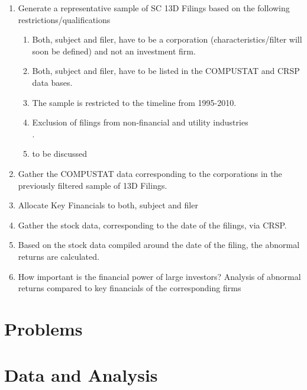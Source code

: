 \documentclass[a4paper,12pt]{article}
\begin{document}
\begin{enumerate}
\item Generate a representative sample of SC 13D Filings based on the following restrictions/qualifications

	\begin{enumerate}
	\item Both, subject and filer, have to be a corporation (characteristics/filter will soon be defined) and not an investment firm.
  \item Both, subject and filer, have to be listed in the COMPUSTAT and CRSP data bases.
	\item The sample is restricted to the timeline from 1995-2010.
	\item Exclusion of filings from non-financial and utility industries \\ 
	\citep{Brigida2012}.
	\item to be discussed
	\end{enumerate}

\item Gather the COMPUSTAT data corresponding to the corporations in the previously filtered sample of 13D Filings.
\item Allocate Key Financials to both, subject and filer
\item Gather the stock data, corresponding to the date of the filings, via CRSP.
\item Based on the stock data compiled around the date of the filing, the abnormal returns are calculated. 
\item How important is the financial power of large investors? Analysis of abnormal returns compared to key financials of the corresponding firms

\end{enumerate}


\section{Problems}






\section{Data and Analysis}

\printbibliography
\end{document}
